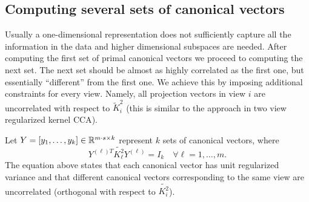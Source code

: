 

\subsection{Computing several sets of canonical vectors}\label{subsec:severalCanonicalVectors}
Usually a one-dimensional representation does not sufficiently capture
all the information in the data and higher dimensional subspaces are
needed. After computing the first set of primal canonical vectors we
proceed to computing the next set. The next set should be almost as
highly correlated as the first one, but essentially ``different'' from
the first one. We achieve this by imposing additional constraints for
every view. Namely, all projection vectors in view $i$ are
uncorrelated with respect to $\widetilde{K}_i^2$ (this is similar to
the approach in two view regularized kernel CCA\cite{FBMJ}).
\par
Let $Y = \left[y_1, \ldots, y_k\right] \in \mathbb{R}^{m\cdot s  \times k}$ represent $k$ sets of canonical vectors, where
$$Y^{(\ell)T} \widetilde{K_{\ell}^2} Y^{(\ell)} = I_k  \quad\forall \ell = 1,\ldots, m. $$
The equation above states that each canonical vector has unit regularized variance and that different canonical vectors corresponding to the same view are uncorrelated (orthogonal with respect to $\widetilde{K_i^2}$).



